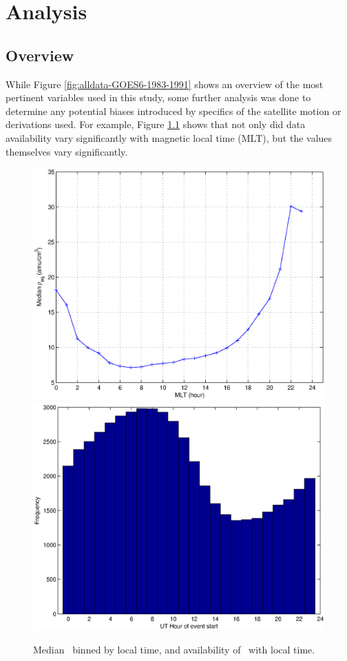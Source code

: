 \chapter[Analysis]{Analysis}

\section{Overview}
While Figure \ref{fig:alldata-GOES6-1983-1991} shows an overview of the most pertinent variables used in this study, some further analysis was done to determine any potential biases introduced by specifics of the satellite motion or derivations used. For example, Figure \ref{fig:ByHourExample} shows that not only did data availability vary significantly with magnetic local time (MLT), but the values themselves vary significantly. 

\begin{figure}[htp!]
\centering
\includegraphics[width=0.7\linewidth]{Figures/rhoMLT.eps}
\includegraphics[width=0.7\linewidth]{Figures/nansbyhour.eps}
\caption{Median \req\ binned by local time, and availability of \req\ with local time. }
\label{fig:ByHourExample}
\end{figure}


